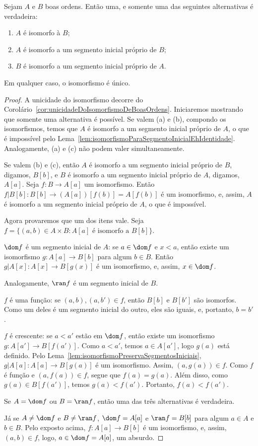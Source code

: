 \begin{theorem}[$\BST$]\label{thm:comparacaoDeBoasOrdens}
    Sejam $A$ e $B$ boas ordens.
    Então uma, e somente uma das seguintes alternativas é verdadeira:

    \begin{enumerate}[label=(\alph*)]
        \item $A$ é isomorfo à $B$;
        \item $A$ é isomorfo a um segmento inicial próprio de $B$;
        \item $B$ é isomorfo a um segmento inicial próprio de $A$.
    \end{enumerate} 
    Em qualquer caso, o isomorfismo é único.
\end{theorem}
\begin{proof}
    A unicidade do isomorfismo decorre do Corolário~\ref{cor:unicidadeDoIsomorfismoDeBoasOrdens}.
    Iniciaremos mostrando que somente uma alternativa é possível.
    Se valem (a) e (b), compondo os isomorfismos, temos que $A$ é isomorfo a um segmento inicial próprio de $A$, o que é impossível pelo Lema~\ref{lem:isomorfismoParaSegmentoInicialEhIdentidade}.
    Analogamente, (a) e (c) não podem valer simultaneamente.

    Se valem (b) e (c), então $A$ é isomorfo a um segmento inicial próprio de $B$, digamos, $B[b]$, e $B$ é isomorfo a um segmento inicial próprio de $A$, digamos, $A[a]$.
    Seja $f:B\to A[a]$ um isomorfismo.
    Então $f|B[b]: B[b]\to (A[a])[f(b)]=A[f(b)]$ é um isomorfismo, e, assim, $A$ é isomorfo a um segmento inicial próprio de $A$, o que é impossível.

    Agora provaremos que um dos itens vale.
    Seja $f=\{(a, b)\in A\times B : A[a]\text{ é isomorfo a }B[b]\}$.

    $\dom f$ é um segmento inicial de $A$: se $a\in \dom f$ e $x<a$, então existe um isomorfismo $g: A[a]\to B[b]$ para algum $b\in B$.
    Então $g|A[x]: A[x]\to B[g(x)]$ é um isomorfismo, e, assim, $x\in \dom f$.

    Analogamente, $\ran f$ é um segmento inicial de $B$.

    $f$ é uma função: se $(a, b), (a, b')\in f$, então $B[b]$ e $B[b']$ são isomorfos.
    Como um deles é um segmento inicial do outro, eles são iguais, e, portanto, $b=b'$.

    $f$ é crescente: se $a<a'$ estão em $\dom f$, então existe um isomorfismo
    $g: A[a']\to B[f(a')]$.
    Como $a<a'$, temos $a\in A[a']$, logo $g(a)$ está definido.
    Pelo Lema~\ref{lem:isomorfismoPreservaSegmentosIniciais}, $g|A[a]: A[a]\to B[g(a)]$ é um isomorfismo.
    Assim, $(a,g(a))\in f$.
    Como $f$ é função e $(a,f(a))\in f$, segue que $f(a)=g(a)$.
    Além disso, como $g(a)\in B[f(a')]$, temos $g(a)<f(a')$.
    Portanto, $f(a)<f(a')$.

    Se $A=\dom f$ ou $B=\ran f$, então uma das três alternativas é verdadeira.
    
    Já se $A\neq \dom f$ e $B\neq \ran f$, $\dom f=A[a]$ e $\ran f=B[b]$ para algum $a\in A$ e $b\in B$.
    Pelo exposto acima, $f: A[a]\to B[b]$ é um isomorfismo, e, assim, $(a, b)\in f$, logo, $a \in \dom f=A[a]$, um absurdo.
\end{proof}
